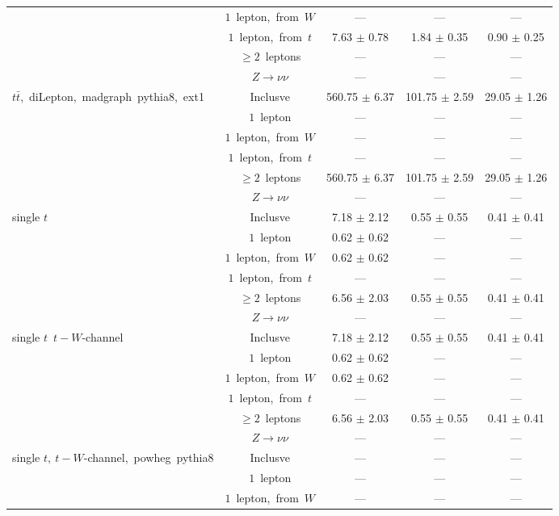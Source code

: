 \documentclass{article}
\begin{document}
\begin{longtable}{|l|c|c|c|c|}
 & $1$~lepton,~from~$W$  & ---  & ---  & --- \\* 
 & $1$~lepton,~from~$t$  & 7.63 $\pm$ 0.78  & 1.84 $\pm$ 0.35  & 0.90 $\pm$ 0.25 \\* 
 & $\ge2$~leptons  & ---  & ---  & --- \\* 
 & $Z\rightarrow\nu\nu$  & ---  & ---  & --- \\* 
\hline 
\multirow{6}{*}{$t\bar{t}$,~diLepton,~madgraph~pythia8,~ext1} & Inclusve  & 560.75 $\pm$ 6.37  & 101.75 $\pm$ 2.59  & 29.05 $\pm$ 1.26 \\* 
 & $1$~lepton  & ---  & ---  & --- \\* 
 & $1$~lepton,~from~$W$  & ---  & ---  & --- \\* 
 & $1$~lepton,~from~$t$  & ---  & ---  & --- \\* 
 & $\ge2$~leptons  & 560.75 $\pm$ 6.37  & 101.75 $\pm$ 2.59  & 29.05 $\pm$ 1.26 \\* 
 & $Z\rightarrow\nu\nu$  & ---  & ---  & --- \\* 
\hline 
\multirow{6}{*}{single $t$} & Inclusve  & 7.18 $\pm$ 2.12  & 0.55 $\pm$ 0.55  & 0.41 $\pm$ 0.41 \\* 
 & $1$~lepton  & 0.62 $\pm$ 0.62  & ---  & --- \\* 
 & $1$~lepton,~from~$W$  & 0.62 $\pm$ 0.62  & ---  & --- \\* 
 & $1$~lepton,~from~$t$  & ---  & ---  & --- \\* 
 & $\ge2$~leptons  & 6.56 $\pm$ 2.03  & 0.55 $\pm$ 0.55  & 0.41 $\pm$ 0.41 \\* 
 & $Z\rightarrow\nu\nu$  & ---  & ---  & --- \\* 
\hline 
\multirow{6}{*}{single $t$~$t-W$-channel} & Inclusve  & 7.18 $\pm$ 2.12  & 0.55 $\pm$ 0.55  & 0.41 $\pm$ 0.41 \\* 
 & $1$~lepton  & 0.62 $\pm$ 0.62  & ---  & --- \\* 
 & $1$~lepton,~from~$W$  & 0.62 $\pm$ 0.62  & ---  & --- \\* 
 & $1$~lepton,~from~$t$  & ---  & ---  & --- \\* 
 & $\ge2$~leptons  & 6.56 $\pm$ 2.03  & 0.55 $\pm$ 0.55  & 0.41 $\pm$ 0.41 \\* 
 & $Z\rightarrow\nu\nu$  & ---  & ---  & --- \\* 
\hline 
\multirow{6}{*}{single $t,~t-W$-channel,~powheg~pythia8} & Inclusve  & ---  & ---  & --- \\* 
 & $1$~lepton  & ---  & ---  & --- \\* 
 & $1$~lepton,~from~$W$  & ---  & ---  & --- \\* 

\end{longtable}
\end{document}
